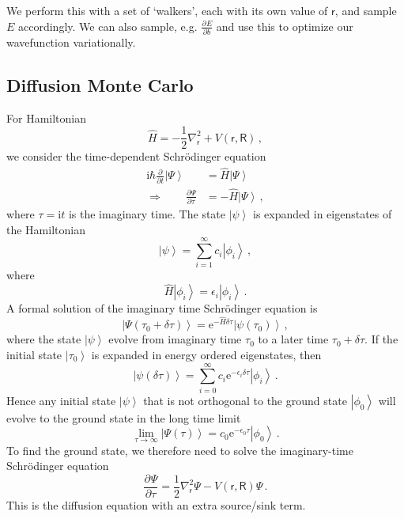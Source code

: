 \documentclass{article}
\theoremstyle{plain}\theoremheaderfont{\normalfont\itshape}\theorembodyfont{\rmfamily}\theoremseparator{.}\newtheorem*{rem}{Remark}\newtheorem*{ex}{Example}\newtheorem*{proof}{Proof}\newtheorem*{altp}{Alternative proof}
\theoremstyle{plain}\theoremheaderfont{\normalfont\bfseries}\theorembodyfont{\rmfamily}\theoremseparator{.}\newtheorem{thm}{Theorem}[section]\newtheorem{lem}[thm]{Lemma}\newtheorem{prop}[thm]{Proposition}\newtheorem*{cor}{Corollary}\newtheorem{defn}[thm]{Definition}\newtheorem{clm}[thm]{Claim}\newtheorem{clminproof}{Claim}
\theoremstyle{break}\theoremheaderfont{\normalfont\itshape}\theorembodyfont{\rmfamily}\theoremseparator{.\medskip}\newtheorem*{proofskip}{Proof}\newtheorem*{exs}{Examples}\newtheorem*{rems}{Remarks}
\theoremstyle{break}\theoremheaderfont{\normalfont\bfseries}\theorembodyfont{\rmfamily}\theoremseparator{.\medskip}\newtheorem{lemskip}[thm]{Lemma}\newtheorem{defnskip}[thm]{Definition}\newtheorem{propskip}[thm]{Proposition}\newtheorem{thmskip}[thm]{Theorem}
\numberwithin{equation}{section}
\newcommand{\ii}{\mathrm{i}}
\newcommand{\e}{\mathrm{e}}
\newcommand{\pdv}[3][]{\frac{\partial^{#1} #2}{{\partial #3}^{#1}}}
\newcommand{\ket}[1]{\left| #1 \right\rangle}
\newcommand{\laplacian}{\nabla^2}
\newcommand{\rr}{\mathsf{r}}
\newcommand{\RR}{\mathsf{R}}
\begin{document}
    We perform this with a set of `walkers', each with its own value of \(\rr\), and sample \(E\) accordingly. We can also sample, e.g. \(\pdv{E}{b}\) and use this to optimize our wavefunction variationally.
    \subsection{Diffusion Monte Carlo}
    For Hamiltonian
    \begin{equation}
        \hat{H}=-\frac{1}{2}\laplacian_\rr +V(\rr,\RR)\,,
    \end{equation}
    we consider the time-dependent Schr\"{o}dinger equation
    \begin{align}
        \ii\hbar\pdv{}{t}\ket{\Psi}&=\hat{H}\ket{\Psi}\\
        \Rightarrow\qquad \pdv{\Psi}{\tau}&=-\hat{H}\ket{\Psi}\,,
    \end{align}
    where \(\tau=\ii t\) is the imaginary time. The state \(\ket{\psi}\) is expanded in eigenstates of the Hamiltonian
    \begin{equation}
        \ket{\psi}=\sum_{i=1}^{\infty}c_i\ket{\phi_i}\,,
    \end{equation}
    where
    \begin{equation}
        \hat{H}\ket{\phi_i}=\epsilon_i\ket{\phi_i}\,.
    \end{equation}
    A formal solution of the imaginary time Schr\"{o}dinger equation is
    \begin{equation}
        \ket{\Psi(\tau_0+\delta\tau)}=\e^{-\hat{H}\delta\tau}\ket{\psi(\tau_0)}\,,
    \end{equation}
    where the state \(\ket{\psi}\) evolve from imaginary time \(\tau_0\) to a later time \(\tau_0+\delta\tau\). If the initial state \(\ket{\tau_0}\) is expanded in energy ordered eigenstates, then
    \begin{equation}
        \ket{\psi(\delta\tau)}=\sum_{i=0}^{\infty}c_i\e^{-\epsilon_i\delta\tau}\ket{\phi_i}\,.
    \end{equation}
    Hence any initial state \(\ket{\psi}\) that is not orthogonal to the ground state \(\ket{\phi_0}\) will evolve to the ground state in the long time limit
    \begin{equation}
        \lim_{\tau\to\infty}\ket{\Psi(\tau)}=c_0\e^{-\epsilon_0\tau}\ket{\phi_0}\,.
    \end{equation}
    To find the ground state, we therefore need to solve the imaginary-time Schr\"{o}dinger equation
    \begin{equation}
        \pdv{\Psi}{\tau}=\frac{1}{2}\laplacian_\rr\Psi-V(\rr,\RR)\Psi\,.
    \end{equation}
    This is the diffusion equation with an extra source/sink term.
\end{document}
